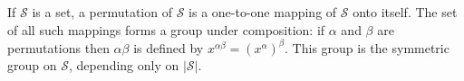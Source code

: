 If $\mathcal{S}$ is a set, a permutation of $\mathcal{S}$ is a one-to-one mapping of $\mathcal{S}$ onto itself. The set of all such mappings forms a group under composition: if $\alpha$ and $\beta$ are permutations then $\alpha\beta$ is defined by $x^{\alpha\beta} = (x^\alpha)^\beta$. This group is the symmetric group on $\mathcal{S}$, depending only on $|\mathcal{S}|$.
